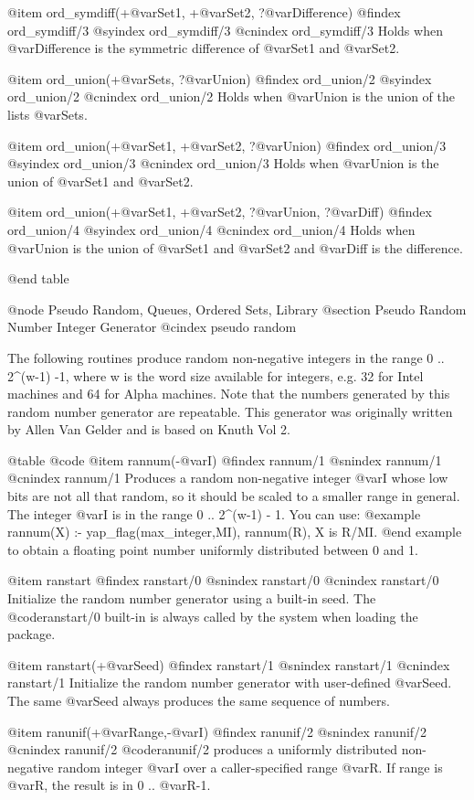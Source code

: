 {{{{{{{{@item ord_symdiff(+@var{Set1}, +@var{Set2}, ?@var{Difference})
@findex ord_symdiff/3
@syindex ord_symdiff/3
@cnindex ord_symdiff/3
Holds when @var{Difference} is the symmetric difference of @var{Set1}
and @var{Set2}.

@item ord_union(+@var{Sets}, ?@var{Union})
@findex ord_union/2
@syindex ord_union/2
@cnindex ord_union/2
Holds when @var{Union} is the union of the lists @var{Sets}.

@item ord_union(+@var{Set1}, +@var{Set2}, ?@var{Union})
@findex ord_union/3
@syindex ord_union/3
@cnindex ord_union/3
Holds when @var{Union} is the union of @var{Set1} and @var{Set2}.

@item ord_union(+@var{Set1}, +@var{Set2}, ?@var{Union}, ?@var{Diff})
@findex ord_union/4
@syindex ord_union/4
@cnindex ord_union/4
Holds when @var{Union} is the union of @var{Set1} and @var{Set2} and
@var{Diff} is the difference.

@end table

@node Pseudo Random, Queues, Ordered Sets, Library
@section Pseudo Random Number Integer Generator
@cindex pseudo random

The following routines produce random non-negative integers in the range
0 .. 2^(w-1) -1, where w is the word size available for integers, e.g.
32 for Intel machines and 64 for Alpha machines. Note that the numbers
generated by this random number generator are repeatable. This generator
was originally written by Allen Van Gelder and is based on Knuth Vol 2.

@table @code 
@item rannum(-@var{I})
@findex rannum/1
@snindex rannum/1
@cnindex rannum/1
Produces a random non-negative integer @var{I} whose low bits are not
all that random, so it should be scaled to a smaller range in general.
The integer @var{I} is in the range 0 .. 2^(w-1) - 1. You can use:
@example
rannum(X) :- yap_flag(max_integer,MI), rannum(R), X is R/MI.
@end example
to obtain a floating point number uniformly distributed between 0 and 1.

@item ranstart
@findex ranstart/0
@snindex ranstart/0
@cnindex ranstart/0
Initialize the random number generator using a built-in seed. The
@code{ranstart/0} built-in is always called by the system when loading
the package.

@item ranstart(+@var{Seed})
@findex ranstart/1
@snindex ranstart/1
@cnindex ranstart/1
Initialize the random number generator with user-defined @var{Seed}. The
same @var{Seed} always produces the same sequence of numbers.

@item ranunif(+@var{Range},-@var{I})
@findex ranunif/2
@snindex ranunif/2
@cnindex ranunif/2
@code{ranunif/2} produces a uniformly distributed non-negative random
integer @var{I} over a caller-specified range @var{R}.  If range is @var{R},
the result is in 0 .. @var{R}-1.

}}}}}}}}
